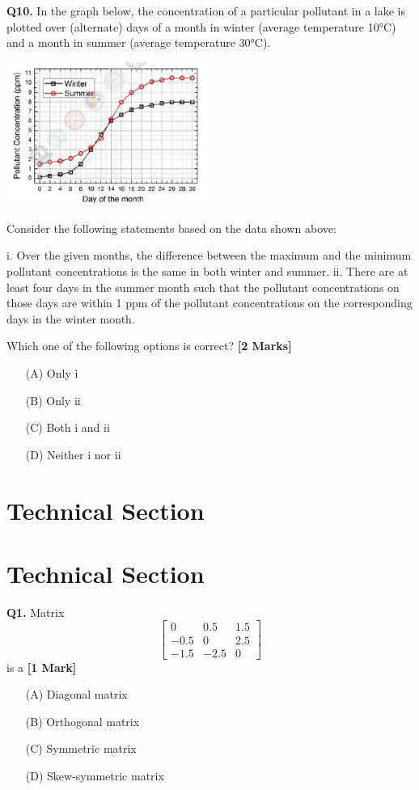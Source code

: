 \documentclass[11pt]{article}
\newcommand{\questiona}[2]{
    \noindent\textbf{Q#2.} #1 \hfill \textbf{[1 Mark]}
}
\newcommand{\questionb}[2]{
    \noindent\textbf{Q#2.} #1 \hfill \textbf{[2 Marks]}
}
\begin{document}
\questionb{In the graph below, the concentration of a particular pollutant in a lake is plotted over (alternate) days of a month in winter (average temperature 10°C) and a month in summer (average temperature 30°C).

\begin{center}
\includegraphics[width=0.5\textwidth]{figures/10.png}
\end{center}

Consider the following statements based on the data shown above:

i. Over the given months, the difference between the maximum and the minimum pollutant concentrations is the same in both winter and summer.  
ii. There are at least four days in the summer month such that the pollutant concentrations on those days are within 1 ppm of the pollutant concentrations on the corresponding days in the winter month.

Which one of the following options is correct?}{10}
\begin{enumerate}
    \item[(A)] Only i
    \item[(B)] Only ii  
    \item[(C)] Both i and ii
    \item[(D)] Neither i nor ii
\end{enumerate}

\vspace{1 cm}

\section*{Technical Section}

\section*{Technical Section}

\questiona{Matrix  
\[\begin{bmatrix}
0 & 0.5 & 1.5 \\
-0.5 & 0 & 2.5 \\
-1.5 & -2.5 & 0
\end{bmatrix}\]
is a}{1}
\begin{enumerate}
    \item[(A)] Diagonal matrix  
    \item[(B)] Orthogonal matrix  
    \item[(C)] Symmetric matrix
    \item[(D)] Skew-symmetric matrix
\end{enumerate}
\end{document}
